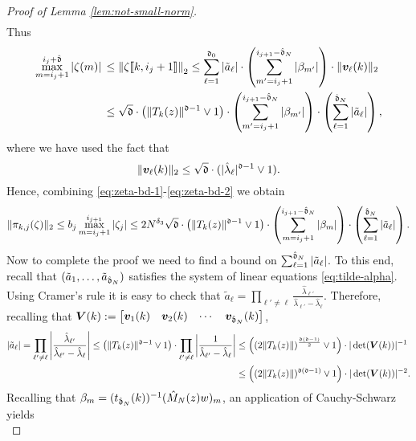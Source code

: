 \documentclass{amsart}
\numberwithin{equation}{section}
\def\corEE{\textcolor{amethyst}}
\def\corEE{}
\begin{document}
\begin{proof}[Proof of Lemma \ref{lem:not-small-norm}]
\begin{align}
\end{align}
Thus
\begin{align}\label{eq:zeta-bd-2}
\max_{m=i_j+1}^{i_j+\hat{\mathfrak{d}}} |\zeta(m)| & \, \le \left\|\zeta\llbracket k,i_j+1 \rrbracket\right\|_2 \le \sum_{\ell=1}^{\mathfrak{d}_0} |\tilde{a}_\ell| \cdot \left( \sum_{m'=i_j+1}^{i_{j+1}-\hat{\mathfrak{d}}_N} |\beta_{m'}|\right) \cdot \|{\bm v}_\ell(k)\|_2\notag\\
& \,  \le \sqrt{\mathfrak{d}} \cdot \left(\|T_k(z)\|^{\mathfrak{d}-1}\vee 1\right) \cdot \left( \sum_{m'={i_j+1}}^{i_{j+1}-\hat{\mathfrak{d}}_N} |\beta_{m'}|\right) \cdot  \left( \sum_{\ell=1}^{\hat{\mathfrak{d}}_N} |\tilde{a}_\ell|\right),
\end{align}
where we have used the fact that
\[
\|{\bm v}_\ell(k)\|_2 \le \sqrt{\mathfrak{d}} \cdot (|\hat{\lambda}_\ell|^{\mathfrak{d}-1}\vee 1).
\]
Hence, combining \eqref{eq:zeta-bd-1}-\eqref{eq:zeta-bd-2} we obtain
\begin{equation}\label{eq:pi_kj_zeta}
\|\pi_{k,j}(\zeta)\|_2 \le b_j\max_{m=i_j+1}^{i_{j+1}} |\zeta_j| \le 2N^{\delta_3} \sqrt{\mathfrak{d}}  \cdot \left(\|T_k(z)\|^{\mathfrak{d}-1}\vee 1\right)\cdot \left( \sum_{m=i_j+1}^{i_{j+1}-\hat{\mathfrak{d}}_N} |\beta_m|\right) \cdot  \left( \sum_{\ell=1}^{\hat{\mathfrak{d}}_N} |\tilde{a}_\ell|\right).
\end{equation}
Now to complete the proof we need to find a bound on $\sum_{\ell=1}^{\hat{\mathfrak{d}}_N} |\tilde{a}_\ell|$. To this end, recall that $(\tilde{a}_1,\ldots,\tilde{a}_{\hat{\mathfrak{d}}_N})$ satisfies the system of linear equations \eqref{eq:tilde-alpha}. Using Cramer's rule it is easy to check that $\tilde{a}_\ell = \prod_{\ell' \ne \ell} \frac{\hat{\lambda}_{\ell'}}{\hat{\lambda}_{\ell'}- \hat{\lambda}_\ell}$. Therefore, \corEE{recalling that ${\bm V}(k):=\begin{bmatrix} {\bm v}_1(k) & {\bm v}_2(k) & \cdots & {\bm v}_{\hat{\mathfrak{d}}_N}(k) \end{bmatrix}$},
\begin{align*}
|\tilde{a}_\ell|= \prod_{\ell' \ne \ell} \left|\frac{\hat{\lambda}_{\ell'}}{\hat{\lambda}_{\ell'}- \hat{\lambda}_\ell}\right| \le \left(\|T_k(z)\|^{\mathfrak{d} -1} \vee 1\right) \cdot \prod_{\ell' \ne \ell} \left|\frac{1}{\hat{\lambda}_{\ell'}- \hat{\lambda}_\ell}\right|  & \le \left((2\| T_k(z)\|)^{\frac{\mathfrak{d}(\mathfrak{d}-1)}{2}} \vee 1\right) \cdot |\det({\bm V}(k))|^{-1} \\
& \le \left((2\| T_k(z)\|)^{\mathfrak{d}(\mathfrak{d}-1)} \vee 1\right) \cdot |\det({\bm V}(k))|^{-2}.
\end{align*}
Recalling that $\beta_m=(t_{\hat{\mathfrak{d}}_N}(k))^{-1} (\hat{M}_N(z)w)_m$, an application of Cauchy-Schwarz yields
\begin{equation}\label{eq:zeta-lbd-norm-1}

\end{equation}
\end{proof}
\end{document}
